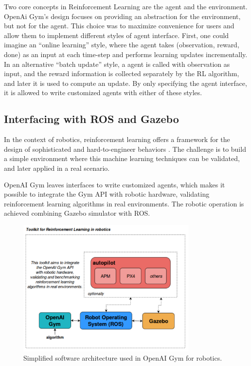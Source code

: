 Two core concepts in Reinforcement Learning are the agent and the environment. OpenAi Gym's design focuses on providing an abstraction for the environment, but not for the agent. This choice was to maximize convenience for users and allow them to implement different styles of agent interface. First, one could imagine an ``online learning'' style, where the agent takes (observation, reward, done) as an input at each time-step and performs learning updates incrementally. In an alternative ``batch update'' style, a agent is called with observation as input, and the reward information is collected separately by the RL algorithm, and later it is used to compute an update. By only specifying the agent interface, it is allowed to write customized agents with either of these styles.

\subsection{Interfacing with ROS and Gazebo}

In the context of robotics, reinforcement learning offers a framework for the design of sophisticated and hard-to-engineer behaviors \cite{RLsurvey2013}. The challenge is to build a simple environment where this machine learning techniques can be validated, and later applied in a real scenario.

OpenAI Gym leaves interfaces to write customized agents, which makes it possible to integrate the Gym API with robotic hardware, validating reinforcement learning algorithms in real environments. The robotic operation is achieved combining Gazebo simulator with ROS.

\begin{figure}[h]
\centering
\includegraphics[width=0.8\textwidth]{figs/ch2/toolkit-of-openaigym}
\caption{Simplified software architecture used in OpenAI Gym for robotics.}
\label{fig:openai-archi}
\end{figure}

